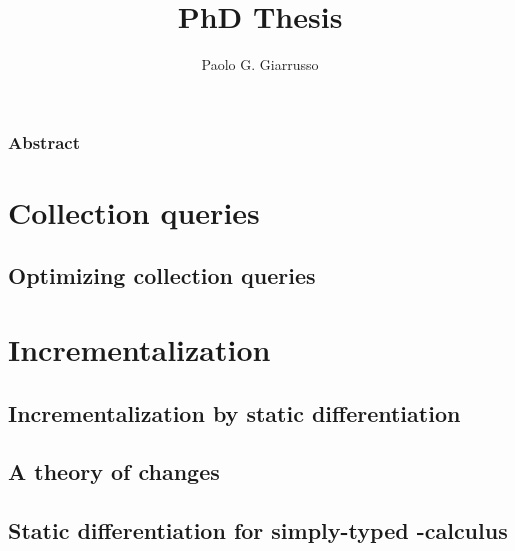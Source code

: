 \documentclass{book}
\title{PhD Thesis}
\author{Paolo G. Giarrusso}
\begin{document}
\maketitle


\section*{Abstract}




\part{Collection queries}
\chapter{Optimizing collection queries}
\label{sec:ch-aosd13}






\part{Incrementalization}
\chapter{Incrementalization by static differentiation}


\chapter{A theory of changes}
%


\chapter{Static differentiation for simply-typed \TitleLambda{}-calculus}







\end{document}
